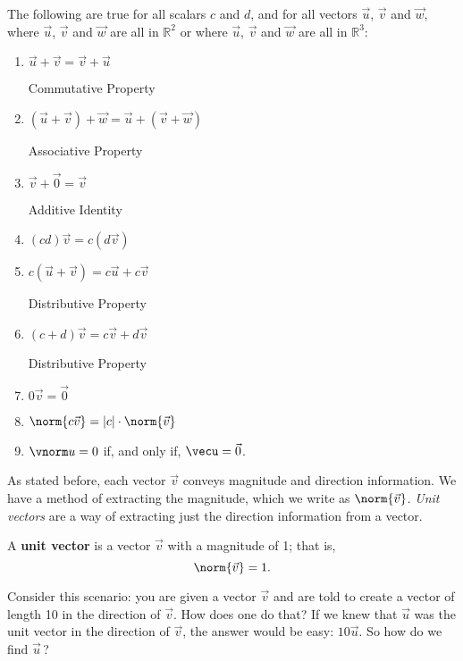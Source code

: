 {The following are true for all scalars $c$ and $d$, and for all vectors $\vec u$, $\vec v$ and $\vec w$, where $\vec u$, $\vec v$ and $\vec w$ are all in $\mathbb{R}^2$ or where $\vec u$, $\vec v$ and $\vec w$ are all in $\mathbb{R}^3$:
\begin{enumerate}
	\item \parbox{150pt}{$\vec u+\vec v = \vec v+\vec u$}Commutative Property
	\item \parbox{150pt}{$(\vec u+\vec v)+\vec w = \vec u+(\vec v+\vec w)$}Associative Property
	\item \parbox{150pt}{$\vec v+\vec 0 = \vec v$}Additive Identity
	\item \parbox{150pt}{$(cd)\vec v= c(d\vec v)$}
	\item \parbox{150pt}{$c(\vec u+\vec v) = c\vec u+c\vec v$}Distributive Property
	\item \parbox{150pt}{$(c+d)\vec v = c\vec v+d\vec v$}Distributive Property
	\item \parbox{150pt}{$0\vec v = \vec 0$}
	\item	\parbox{150pt}{$\norm{c\vec v} = |c|\cdot\norm{\vec v}$}\label{thm:norm_prop}
	\item	$\vnorm u = 0$ if, and only if, $\vecu = \vec 0$.  \label{thm:zero_norm}
\end{enumerate}}

%

As stated before, each vector $\vec v$ conveys magnitude and direction information. We have a method of extracting the magnitude, which we write as $\norm{\vec v}$. \textit{Unit vectors} are a way of extracting just the direction information from a vector.

{A \textbf{unit vector} is a vector $\vec v$ with a magnitude of 1; that is, 
$$\norm{\vec v}=1.$$}

Consider this scenario: you are given a vector $\vec v$ and are told to create a vector of length 10 in the direction of $\vec v$. How does one do that? If we knew that $\vec u$ was the unit vector in the direction of $\vec v$, the answer would be easy: $10\vec u$. So how do we find $\vec u$\,?

